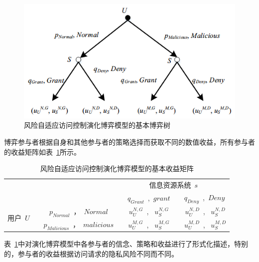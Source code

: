 \begin{figure}[htbp]
	\centering
	\includegraphics[width = 0.6\linewidth]{./figures/game-tree.png}
	\caption{风险自适应访问控制演化博弈模型的基本博弈树}
	\label{fig:game-tree}
\end{figure}

博弈参与者根据自身和其他参与者的策略选择而获取不同的数值收益，所有参与者的收益矩阵如表~\ref{tab:privacy-utilities-matrix}所示。

\begin{table}[htbp]
	\caption{风险自适应访问控制演化博弈模型的基本收益矩阵}
	\label{tab:privacy-utilities-matrix}
	\centering
	\begin{tabular}{cccc}%
		
		\toprule
		\textbf{ }&\textbf{ }&\multicolumn{2}{c}{信息资源系统~$s$~}\\
		\textbf{ }&\textbf{ }& ~$q_{Grant}$~,~$grant$~&~$q_{Deny}$~,~$Deny~$\\
		\midrule
		\multirow{2}{*}{用户~$U$~} & ~$p_{Normal}$~，~$Normal$~ &~$u_U^{N,G}$~, ~$u_S^{N,G}$~ & ~$u_U^{N,D}$~, ~$u_S^{N,D}$\\
		& ~$p_{Malicious}$~，~$malicious$~ &~$u_U^{M,G}$~, ~$u_S^{M,G}$~ & ~$u_U^{M,D}$~, ~$u_S^{M,D}$\\
		\bottomrule
	\end{tabular}
\end{table}

表~\ref{tab:privacy-utilities-matrix}中对演化博弈模型中各参与者的信念、策略和收益进行了形式化描述，特别的，参与者的收益根据访问请求的隐私风险不同而不同。


